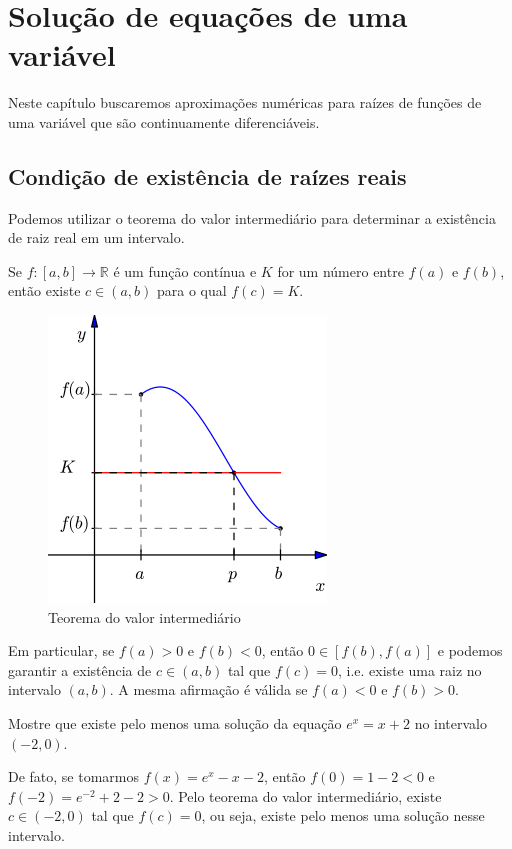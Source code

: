 \documentclass[main.tex]{subfiles}
\begin{document}
\chapter{Solução de equações de uma variável}

Neste capítulo buscaremos aproximações numéricas para raízes de funções de uma variável que são continuamente diferenciáveis.

\section{Condição de existência de raízes reais}

Podemos utilizar o teorema do valor intermediário para determinar a existência de raiz real em um intervalo.

\begin{teo}
Se $f:[a,b]\to\mathbb{R}$ é um função contínua e $K$ for um número entre $f(a)$ e $f(b)$, então existe $c\in(a,b)$ para o qual $f(c)=K$.
\end{teo}

\begin{figure}[h!]
  \centering
  \includegraphics[scale=0.5]{./cap_equacao1d/pics/teorema_do_valor_intermediario/teorema_do_valor_intermediario}
  \caption{Teorema do valor intermediário}
  \label{fig:teorema_do_valor_intermediario}
\end{figure}

Em particular, se $f(a)>0$ e $f(b)<0$, então $0\in [f(b),f(a)]$ e podemos garantir a existência de $c\in(a,b)$ tal que $f(c)=0$, i.e. existe uma raiz no intervalo $(a,b)$. A mesma afirmação é válida se $f(a)<0$ e $f(b)>0$.
\begin{ex}
Mostre que existe pelo menos uma solução da equação $e^x=x+2$ no intervalo $(-2,0)$.

De fato, se tomarmos $f(x)=e^x-x-2$, então $f(0)=1-2<0$ e $f(-2)=e^{-2}+2-2>0$. Pelo teorema do valor intermediário, existe $c\in(-2,0)$ tal que $f(c)=0$, ou seja, existe pelo menos uma solução nesse intervalo.
\end{ex}
\end{document}
